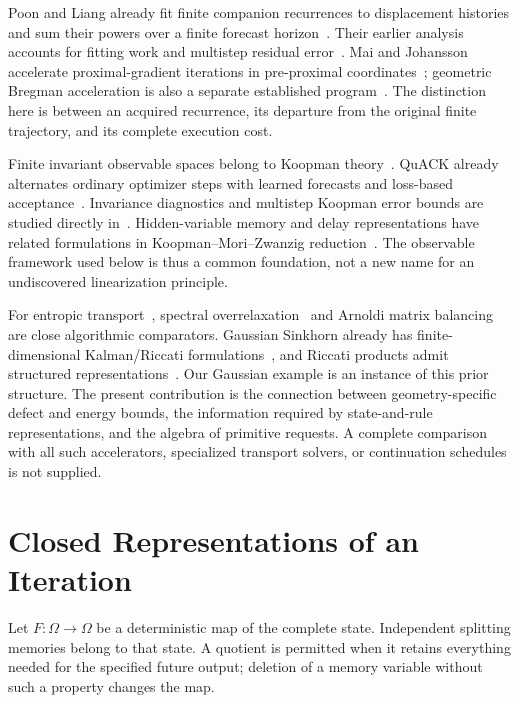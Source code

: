 \documentclass[journal]{IEEEtran}
\theoremstyle{definition}
\begin{document}
Poon and Liang already fit finite companion recurrences to displacement
histories and sum their powers over a finite forecast horizon~\cite{poon2020}.
Their earlier analysis accounts for fitting work and multistep residual
error~\cite{poon2019}. Mai and Johansson accelerate proximal-gradient
iterations in pre-proximal coordinates~\cite{mai}; geometric Bregman
acceleration is also a separate established program~\cite{hanzely}.
The distinction here is between an acquired recurrence, its departure from
the original finite trajectory, and its complete execution cost.

Finite invariant observable spaces belong to Koopman theory~\cite{brunton,ssd}.
QuACK already alternates ordinary optimizer steps with learned forecasts and
loss-based acceptance~\cite{quack}. Invariance diagnostics and multistep
Koopman error bounds are studied directly in~\cite{conradie}. Hidden-variable
memory and delay representations have related formulations in
Koopman--Mori--Zwanzig reduction~\cite{linlu,kamb}. The observable framework
used below is thus a common foundation, not a new name for an undiscovered
linearization principle.

For entropic transport~\cite{peyre}, spectral overrelaxation~\cite{lehmann}
and Arnoldi matrix balancing~\cite{aristodemo} are close algorithmic
comparators. Gaussian Sinkhorn already has finite-dimensional
Kalman/Riccati formulations~\cite{akyildiz}, and Riccati products admit
structured representations~\cite{delmoralhorton}. Our Gaussian example is
an instance of this prior structure. The present contribution is the
connection between geometry-specific defect and energy bounds, the
information required by state-and-rule representations, and the algebra
of primitive requests. A complete comparison with all such accelerators,
specialized transport solvers, or continuation schedules is not supplied.

\section{Closed Representations of an Iteration}
\label{sec:general-geometry}
Let $F:\Omega\to\Omega$ be a deterministic map of the complete state.
Independent splitting memories belong to that state. A quotient is permitted
when it retains everything needed for the specified future output; deletion
of a memory variable without such a property changes the map.
\end{document}
